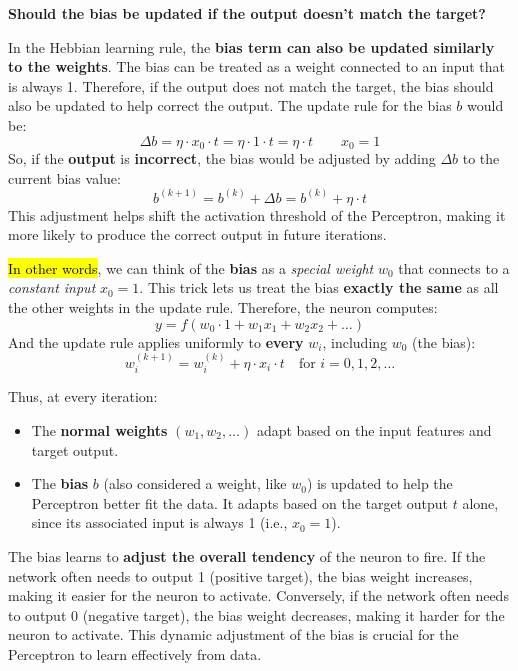 \begin{flushleft}
    \textcolor{Green3}{ \textbf{Should the bias be updated if the output doesn't match the target?}}
\end{flushleft}
In the Hebbian learning rule, the \textbf{bias term can also be updated similarly to the weights}. The bias can be treated as a weight connected to an input that is always 1. Therefore, if the output does not match the target, the bias should also be updated to help correct the output. The update rule for the bias $b$ would be:
\begin{equation}
    \Delta b = \eta \cdot x_{0} \cdot t = \eta \cdot 1 \cdot t = \eta \cdot t \qquad x_{0} = 1
\end{equation}
So, if the \textbf{output} is \textbf{incorrect}, the bias would be adjusted by adding $\Delta b$ to the current bias value:
\begin{equation}
    b^{(k+1)} = b^{(k)} + \Delta b = b^{(k)} + \eta \cdot t
\end{equation}
This adjustment helps shift the activation threshold of the Perceptron, making it more likely to produce the correct output in future iterations.

\highspace
\hl{In other words}, we can think of the \textbf{bias} as a \emph{special weight} $w_{0}$ that connects to a \emph{constant input} $x_{0} = 1$. This trick lets us treat the bias \textbf{exactly the same} as all the other weights in the update rule. Therefore, the neuron computes:
\begin{equation*}
    y = f\left(w_0 \cdot 1 + w_1 x_1 + w_2 x_2 + \dots\right)
\end{equation*}
And the update rule applies uniformly to \textbf{every} $w_i$, including $w_0$ (the bias):
\begin{equation*}
    w_{i}^{(k+1)} = w_{i}^{(k)} + \eta \cdot x_{i} \cdot t \quad \text{for }i = 0, 1, 2, \ldots
\end{equation*}

\highspace
Thus, at every iteration:
\begin{itemize}
    \item The \textbf{normal weights} $\left(w_{1}, w_{2}, \ldots\right)$ adapt based on the input features and target output.
    \item The \textbf{bias} $b$ (also considered a weight, like $w_{0}$) is updated to help the Perceptron better fit the data. It adapts based on the target output $t$ alone, since its associated input is always 1 (i.e., $x_{0} = 1$).
\end{itemize}
The bias learns to \textbf{adjust the overall tendency} of the neuron to fire. If the network often needs to output 1 (positive target), the bias weight increases, making it easier for the neuron to activate. Conversely, if the network often needs to output 0 (negative target), the bias weight decreases, making it harder for the neuron to activate. This dynamic adjustment of the bias is crucial for the Perceptron to learn effectively from data.